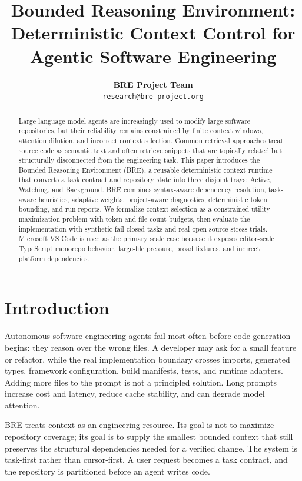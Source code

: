 \documentclass[10pt,twocolumn,letterpaper]{article}
\title{\textbf{Bounded Reasoning Environment: Deterministic Context Control for Agentic Software Engineering}}
\author{\textbf{BRE Project Team} \\ \small{\texttt{research@bre-project.org}}}
\date{}
\begin{document}
\maketitle

\begin{abstract}
Large language model agents are increasingly used to modify large software repositories, but their reliability remains constrained by finite context windows, attention dilution, and incorrect context selection. Common retrieval approaches treat source code as semantic text and often retrieve snippets that are topically related but structurally disconnected from the engineering task. This paper introduces the Bounded Reasoning Environment (BRE), a reusable deterministic context runtime that converts a task contract and repository state into three disjoint trays: Active, Watching, and Background. BRE combines syntax-aware dependency resolution, task-aware heuristics, adaptive weights, project-aware diagnostics, deterministic token bounding, and run reports. We formalize context selection as a constrained utility maximization problem with token and file-count budgets, then evaluate the implementation with synthetic fail-closed tasks and real open-source stress trials. Microsoft VS Code is used as the primary scale case because it exposes editor-scale TypeScript monorepo behavior, large-file pressure, broad fixtures, and indirect platform dependencies.
\end{abstract}

\section{Introduction}
Autonomous software engineering agents fail most often before code generation begins: they reason over the wrong files. A developer may ask for a small feature or refactor, while the real implementation boundary crosses imports, generated types, framework configuration, build manifests, tests, and runtime adapters. Adding more files to the prompt is not a principled solution. Long prompts increase cost and latency, reduce cache stability, and can degrade model attention.

BRE treats context as an engineering resource. Its goal is not to maximize repository coverage; its goal is to supply the smallest bounded context that still preserves the structural dependencies needed for a verified change. The system is task-first rather than cursor-first. A user request becomes a task contract, and the repository is partitioned before an agent writes code.
\end{document}
